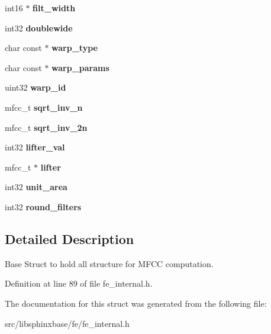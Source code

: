 \begin{DoxyCompactItemize}
\item 
int16 $\ast$ {\bfseries filt\-\_\-width}\label{structmelfb__s_a43c26968a65602f1dce3c02e155eea39}

\item 
int32 {\bfseries doublewide}\label{structmelfb__s_a2f1a3b5e9a985a88dd0a0c57c8e8e682}

\item 
char const $\ast$ {\bfseries warp\-\_\-type}\label{structmelfb__s_a925f6f7a98b33b542f6b53f7c0b1b923}

\item 
char const $\ast$ {\bfseries warp\-\_\-params}\label{structmelfb__s_aa7ba71c21972a822ba7f23391ff92b21}

\item 
uint32 {\bfseries warp\-\_\-id}\label{structmelfb__s_a3b4d756c484accf39aeac42219b2c7ec}

\item 
mfcc\-\_\-t {\bfseries sqrt\-\_\-inv\-\_\-n}\label{structmelfb__s_a1d222190206f979da6f1297197bb6e6b}

\item 
mfcc\-\_\-t {\bfseries sqrt\-\_\-inv\-\_\-2n}\label{structmelfb__s_a09439f191bdf50d17505f0cfcabda229}

\item 
int32 {\bfseries lifter\-\_\-val}\label{structmelfb__s_a605228aea9e9c9028caad09060a07b2e}

\item 
mfcc\-\_\-t $\ast$ {\bfseries lifter}\label{structmelfb__s_a362672e537cb316c538fccc141ad01f8}

\item 
int32 {\bfseries unit\-\_\-area}\label{structmelfb__s_a9fc76cc06249cb211c35c04a31c8a3c1}

\item 
int32 {\bfseries round\-\_\-filters}\label{structmelfb__s_ac2db1578287bd1f5a9b5eed94cc0d987}

\end{DoxyCompactItemize}


\subsection{\-Detailed \-Description}
\-Base \-Struct to hold all structure for \-M\-F\-C\-C computation. 



\-Definition at line 89 of file fe\-\_\-internal.\-h.



\-The documentation for this struct was generated from the following file\-:\begin{DoxyCompactItemize}
\item 
src/libsphinxbase/fe/fe\-\_\-internal.\-h\end{DoxyCompactItemize}
